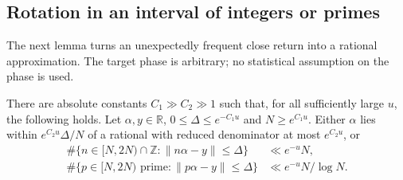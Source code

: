 \subsection{Rotation in an interval of integers or primes}

The next lemma turns an unexpectedly frequent close return into a
rational approximation. The target phase is arbitrary; no statistical
assumption on the phase is used.

\begin{lemma}\label{ar:rotation}
There are absolute constants $C_1\gg C_2\gg1$ such that, for all
sufficiently large $u$, the following holds. Let $\alpha,y\in\mathbb R$,
$0\le\Delta\le e^{-C_1u}$ and $N\ge e^{C_1u}$. Either $\alpha$ lies
within $e^{C_2u}\Delta/N$ of a rational with reduced denominator at most
$e^{C_2u}$, or
\begin{align*}
 \#\{n\in[N,2N)\cap\mathbb Z:\|n\alpha-y\|\le\Delta\}
 &\ll e^{-u}N,\\
 \#\{p\in[N,2N)\text{ prime}:\|p\alpha-y\|\le\Delta\}
 &\ll e^{-u}N/\log N.
\end{align*}
\end{lemma}

